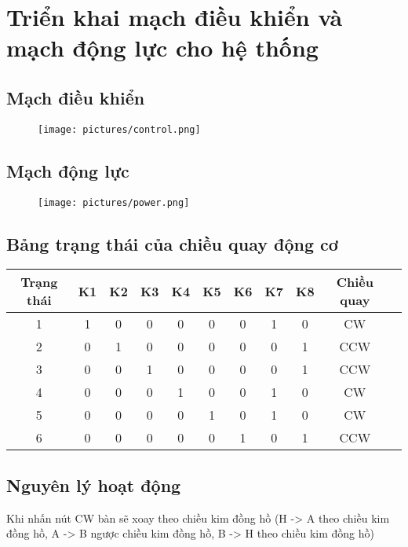 \section{Triển khai mạch điều khiển và mạch động lực cho hệ thống}
\subsection{Mạch điều khiển}
\begin{figure}[H]
    \centering
    \texttt{[image: pictures/control.png]}
\end{figure}
\cleardoublepage
\subsection{Mạch động lực}
\begin{figure}[H]
    \centering
    \texttt{[image: pictures/power.png]}
\end{figure}
\subsection{Bảng trạng thái của chiều quay động cơ}
\begin{center}
\begin{tabular}{|c|c|c|c|c|c|c|c|c|c|c|}
    \hline  
    Trạng thái & K1 & K2 & K3 & K4 & K5 & K6 & K7 & K8 & Chiều quay\\
    \hline
    1 & 1 & 0 & 0 & 0 & 0 & 0 & 1 & 0 & CW\\
    \hline
    2 & 0 & 1 & 0 & 0 & 0 & 0 & 0 & 1 & CCW\\
    \hline
    3 & 0 & 0 & 1 & 0 & 0 & 0 & 0 & 1 & CCW\\
    \hline
    4 & 0 & 0 & 0 & 1 & 0 & 0 & 1 & 0 & CW\\
    \hline
    5 & 0 & 0 & 0 & 0 & 1 & 0 & 1 & 0 & CW\\
    \hline
    6 & 0 & 0 & 0 & 0 & 0 & 1 & 0 & 1 & CCW\\
    \hline
\end{tabular}
\end{center}
\subsection{Nguyên lý hoạt động}
\hspace*{0.5cm}Khi nhấn nút CW bàn sẽ xoay theo chiều kim đồng hồ (H -> A theo chiều kim đồng hồ, A -> B ngược chiều kim đồng hồ, B -> H theo chiều kim đồng hồ)\\

